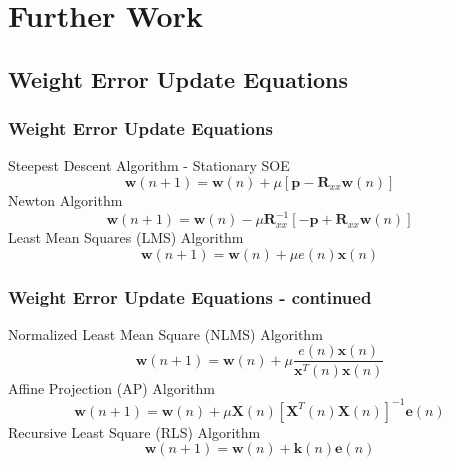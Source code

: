\documentclass[12pt,hyperref=true,mathserif]{beamer}
\begin{document}
\section{Further Work}
\subsection{Weight Error Update Equations}
\begin{frame}
\frametitle{Weight Error Update Equations}
%
Steepest Descent Algorithm - Stationary SOE
\begin{equation}\label{equ:SteepestDA}
  \mathbf{w}(n+1)=\mathbf{w}(n)+\mu[\mathbf{p}-\mathbf{R}_{xx}\mathbf{w}(n)]
\end{equation}
Newton Algorithm
\begin{equation}\label{equ:NetwonA}
  \mathbf{w}(n+1)=\mathbf{w}(n)-\mu\mathbf{R}^{-1}_{xx}[-\mathbf{p}+\mathbf{R}_{xx}\mathbf{w}(n)]
\end{equation}
Least Mean Squares (LMS) Algorithm
\begin{equation}\label{euq:LeastMeanSquare}
  \mathbf{w}(n+1)=\mathbf{w}(n)+\mu e(n)\mathbf{x}(n)
\end{equation}
\end{frame}

\begin{frame}
\frametitle{Weight Error Update Equations - continued}
Normalized Least Mean Square (NLMS) Algorithm
\begin{equation}\label{equ:NormalizedLeastMeanSquare}
  \mathbf{w}(n+1)=\mathbf{w}(n)+\mu\frac{e(n)\mathbf{x}(n)}
  {\mathbf{x}^{T}(n)\mathbf{x}(n)}
\end{equation}
Affine Projection (AP) Algorithm
\begin{equation}\label{equ:AffineProjectionAlgorithm}
  \mathbf{w}(n+1)=\mathbf{w}(n)+\mu\mathbf{X}(n)[\mathbf{X}^{T}(n)\mathbf{X}(n)]^{-1}\mathbf{e}(n)
\end{equation}
Recursive Least Square (RLS) Algorithm
\begin{equation}\label{equ:RecursiveLeastSquare}
  \mathbf{w}(n+1)=\mathbf{w}(n)+\mathbf{k}(n)\mathbf{e}(n)
\end{equation}
\end{frame}
\end{document}
